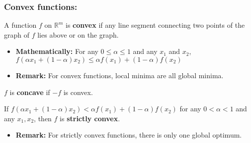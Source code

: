     \subsubsection{Convex functions:}
    \begin{definition}
        A function $f$ on $\mathbb{R}^m$ is \textbf{convex} if any line segment connecting two points of the graph of $f$ lies above or on the graph. 

            \begin{itemize}
                \item \textbf{Mathematically:} For any \( 0 \leq \alpha \leq 1 \) and any \( x_1 \) and \( x_2 \), $f(\alpha x_1 + (1-\alpha) x_2) \leq \alpha f(x_1) + (1-\alpha) f(x_2)$
                \item \textbf{Remark:} For convex functions, local minima are all global minima.
            \end{itemize}
    \end{definition}

    \begin{definition}
        $f$ is \textbf{concave} if $-f$ is convex. 
    \end{definition}

    \begin{definition}
        If $f(\alpha x_1 + (1-\alpha)x_2) < \alpha f(x_1) + (1-\alpha)f(x_2)$ for any \( 0 < \alpha < 1 \) and any \( x_1, x_2 \), then \( f \) is \textbf{strictly convex}.
        \begin{itemize}
            \item \textbf{Remark:} For strictly convex functions, there is only one global optimum.
        \end{itemize}
    \end{definition}

    \begin{example}
    \end{example}

